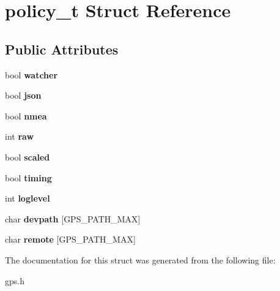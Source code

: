 \hypertarget{structpolicy__t}{\section{policy\-\_\-t \-Struct \-Reference}
\label{structpolicy__t}
}
\subsection*{\-Public \-Attributes}
\begin{DoxyCompactItemize}
\item 
\hypertarget{structpolicy__t_a6ba2e1d4dd68ab8bb428347cf9e1c939}{bool {\bfseries watcher}}\label{structpolicy__t_a6ba2e1d4dd68ab8bb428347cf9e1c939}

\item 
\hypertarget{structpolicy__t_a520bca3b1cf4ca441750dfaa9c105103}{bool {\bfseries json}}\label{structpolicy__t_a520bca3b1cf4ca441750dfaa9c105103}

\item 
\hypertarget{structpolicy__t_aaf4077032fdf14e2823374451086cef0}{bool {\bfseries nmea}}\label{structpolicy__t_aaf4077032fdf14e2823374451086cef0}

\item 
\hypertarget{structpolicy__t_af050f68cd939872fa8a502fb41836634}{int {\bfseries raw}}\label{structpolicy__t_af050f68cd939872fa8a502fb41836634}

\item 
\hypertarget{structpolicy__t_a543f5919c6056749f3bd24ca75e9d9e8}{bool {\bfseries scaled}}\label{structpolicy__t_a543f5919c6056749f3bd24ca75e9d9e8}

\item 
\hypertarget{structpolicy__t_a25fdb926c8c677fca67ae1c080d4154c}{bool {\bfseries timing}}\label{structpolicy__t_a25fdb926c8c677fca67ae1c080d4154c}

\item 
\hypertarget{structpolicy__t_af1018dfcdd055af85b30dfe5f9dfc98c}{int {\bfseries loglevel}}\label{structpolicy__t_af1018dfcdd055af85b30dfe5f9dfc98c}

\item 
\hypertarget{structpolicy__t_a4583f8f8ededd3e9528761d9ab5080ee}{char {\bfseries devpath} \mbox{[}\-G\-P\-S\-\_\-\-P\-A\-T\-H\-\_\-\-M\-A\-X\mbox{]}}\label{structpolicy__t_a4583f8f8ededd3e9528761d9ab5080ee}

\item 
\hypertarget{structpolicy__t_a61e5d3a68da0ae61012c012ee3990f2e}{char {\bfseries remote} \mbox{[}\-G\-P\-S\-\_\-\-P\-A\-T\-H\-\_\-\-M\-A\-X\mbox{]}}\label{structpolicy__t_a61e5d3a68da0ae61012c012ee3990f2e}

\end{DoxyCompactItemize}


\-The documentation for this struct was generated from the following file\-:\begin{DoxyCompactItemize}
\item 
gps.\-h\end{DoxyCompactItemize}
